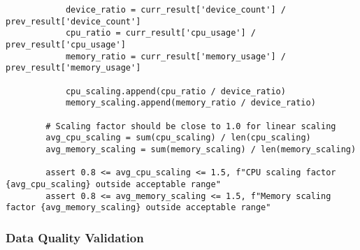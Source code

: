 \documentclass[11pt,a4paper]{report}
\begin{document}
\begin{verbatim}
            device_ratio = curr_result['device_count'] / prev_result['device_count']
            cpu_ratio = curr_result['cpu_usage'] / prev_result['cpu_usage']
            memory_ratio = curr_result['memory_usage'] / prev_result['memory_usage']

            cpu_scaling.append(cpu_ratio / device_ratio)
            memory_scaling.append(memory_ratio / device_ratio)

        # Scaling factor should be close to 1.0 for linear scaling
        avg_cpu_scaling = sum(cpu_scaling) / len(cpu_scaling)
        avg_memory_scaling = sum(memory_scaling) / len(memory_scaling)

        assert 0.8 <= avg_cpu_scaling <= 1.5, f"CPU scaling factor {avg_cpu_scaling} outside acceptable range"
        assert 0.8 <= avg_memory_scaling <= 1.5, f"Memory scaling factor {avg_memory_scaling} outside acceptable range"
\end{verbatim}

\subsubsection{Data Quality Validation}
\end{document}
